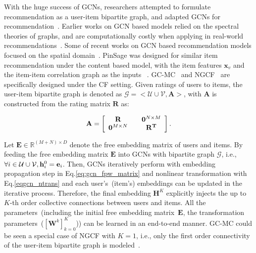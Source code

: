 \documentclass[letterpaper]{article} %
\newcommand{\Mat}[1]{\mathbf{#1}}
\begin{document}
With the huge success of GCNs, researchers attempted to formulate recommendation as a user-item bipartite graph, and adapted GCNs for recommendation~\cite{sigir2019ngcf,NIPSi2017geometric,kdd2018Pinsage}. Earlier works on GCN based models relied on the spectral theories of graphs, and are computationally costly when applying in real-world recommendations~\cite{NIPSi2017geometric,zheng2018spectral}. Some of recent works on GCN based recommendation models focused on the spatial domain~\cite{kdir18,sigir2019ngcf,kdd2018GCMC,kdd2018Pinsage}. PinSage was designed for similar item recommendation under the content based model, with the item features $\mathbf{x}_v$ and the item-item correlation graph as the inputs~\cite{kdd2018Pinsage} . GC-MC~\cite{kdd2018GCMC} and NGCF~\cite{sigir2019ngcf} are specifically designed under the CF setting. Given ratings of users to items, the user-item bipartite graph is denoted as
{\small$\mathcal{G}\!=\!<\mathcal{U}\cup \mathcal{V}, \mathbf{A}>$}, with {\small$\mathbf{A}$} is constructed from the rating matrix {\small$\Mat{R}$} as:

\begin{small}
\begin{equation} \label{eq:cfmat2graph}
\mathbf{A}=\left [
    \begin{array}{c c}\Mat{R} \quad& \Mat{0}^{N\times M} \\
    \Mat{0}^{M\times N}\quad&\Mat{R^T}
    \end{array}
    \right].
\end{equation}
\end{small}



Let {\small$\Mat{E}\in\mathbb{R}^{(M+N)\times D}$} denote the free embedding matrix of users and items. By feeding the free embedding matrix  {\small$\Mat{E}$} into GCNs with bipartite graph $\mathcal{G}$, i.e., $\small{\forall i\in \mathcal{U}\cup \mathcal{V}}, \mathbf{h}^0_i=\mathbf{e}_i$. Then, GCNs iteratively perform with embedding propagation step in Eq.\eqref{eq:gcn_fpw_matrix} and nonlinear transformation with Eq.\eqref{eqgcn_ntrans} and each user's~(item's) embeddings can be updated in the iterative process. Therefore, the final embedding {\footnotesize $\Mat{H}^K$} explicitly injects the up to $K$-th order collective connections between users and items.
All the parameters~(including the initial free embedding matrix~{\small$\Mat{E}$}, the transformation parameters~({\small $[\Mat{W}^k]_{k=0}^K$})) can be learned in an end-to-end manner. GC-MC could be seen a special case of NGCF with $K=1$, i.e., only the first order connectivity of the user-item bipartite graph is modeled~\cite{kdd2018GCMC}.
\end{document}

